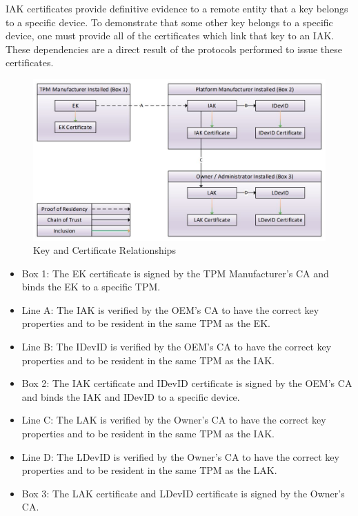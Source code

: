 IAK certificates provide definitive evidence to a remote entity that a key belongs to a specific device. To demonstrate that some other key belongs to a specific device, one must provide all of the certificates which link that key to an IAK. These dependencies are a direct result of the protocols performed to issue these certificates.
\begin{figure}[h]
  \begin{centering}
  \includegraphics[width=\linewidth]{chap_3_figures/certificateRelationships.jpg}
  \par\end{centering}
  \caption{Key and Certificate Relationships \cite{DevIDSpec-TCG}}
  \label{fig:cert_rel}
\end{figure}
\begin{itemize}[itemsep=0pt,parsep=0pt,partopsep=0pt]
  \item \textsf{Box 1}: The EK certificate is signed by the TPM Manufacturer's CA and binds the EK to a specific TPM.
  \item \textsf{Line A}: The IAK is verified by the OEM's CA to have the correct key properties and to be resident in the same TPM as the EK.
  \item \textsf{Line B}: The IDevID is verified by the OEM's CA to have the correct key properties and to be resident in the same TPM as the IAK.
  \item \textsf{Box 2}: The IAK certificate and IDevID certificate is signed by the OEM's CA and binds the IAK and IDevID to a specific device.
  \item \textsf{Line C}: The LAK is verified by the Owner's CA to have the correct key properties and to be resident in the same TPM as the IAK.
  \item \textsf{Line D}: The LDevID is verified by the Owner's CA to have the correct key properties and to be resident in the same TPM as the LAK.
  \item \textsf{Box 3}: The LAK certificate and LDevID certificate is signed by the Owner's CA.
\end{itemize}

